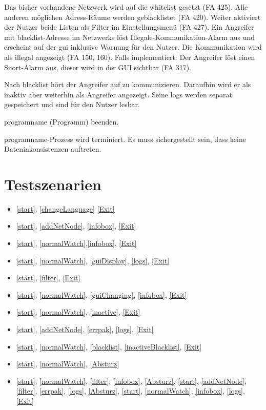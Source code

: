 \begin{description}[style=multiline, leftmargin=4cm, labelwidth=4cm]
  \item[\namedlabel{blacklist}{Blacklist}] Das bisher vorhandene Netzwerk wird auf die \gls{whitelist} gesetzt (FA 425). Alle anderen möglichen Adress-Räume werden geblacklistet (FA 420). Weiter aktiviert der Nutzer beide Listen als Filter im Einstellungsmenü (FA 427). Ein Angreifer mit \gls{blacklist}-Adresse im Netzwerks löst Illegale-Kommunikation-Alarm aus und erscheint auf der \gls{gui} inklusive Warnung für den Nutzer. Die Kommunikation wird als illegal angezeigt (FA 150, 160). Falls implementiert: Der Angreifer löst einen Snort-Alarm aus, dieser wird in der GUI sichtbar (FA 317).
  \item[\namedlabel{inactiveBlacklist}{Inaktiver geblacklisteter Teilnehmer}] Nach \gls{blacklist} hört der Angreifer auf zu kommunizieren. Daraufhin wird er als inaktiv aber weiterhin als Angreifer angezeigt. Seine \glspl{log} werden separat gespeichert und sind für den Nutzer lesbar.
  \item[\namedlabel{Exit}{Exit}] \gls{programname} (Programm) beenden.
  \item[\namedlabel{Absturz}{Absturz}] \gls{programname}-Prozess wird terminiert. Es muss sichergestellt sein, dass keine Dateninkonsistenzen auftreten.
\end{description}

\section{Testszenarien}

\begin{itemize}
  \item \ref{start}, \ref{changeLanguage} \ref{Exit}
  \item \ref{start}, \ref{addNetNode}, \ref{infobox}, \ref{Exit}
  \item \ref{start}, \ref{normalWatch},\ref{infobox}, \ref{Exit}
  \item \ref{start}, \ref{normalWatch}, \ref{guiDisplay}, \ref{logs}, \ref{Exit}
  \item \ref{start}, \ref{filter}, \ref{Exit}
  \item \ref{start}, \ref{normalWatch}, \ref{guiChanging}, \ref{infobox}, \ref{Exit}
  \item \ref{start}, \ref{normalWatch}, \ref{inactive}, \ref{Exit}
  \item \ref{start}, \ref{addNetNode}, \ref{errpak}, \ref{logs}, \ref{Exit}
  \item \ref{start}, \ref{normalWatch}, \ref{blacklist}, \ref{inactiveBlacklist}, \ref{Exit}
  \item \ref{start}, \ref{normalWatch}, \ref{Absturz}
  \item \ref{start}, \ref{normalWatch}, \ref{filter}, \ref{infobox}, \ref{Absturz}, \ref{start}, \ref{addNetNode}, \ref{filter}, \ref{errpak}, \ref{logs}, \ref{Absturz}, \ref{start}, \ref{normalWatch}, \ref{infobox}, \ref{logs}, \ref{Exit}
\end{itemize}

